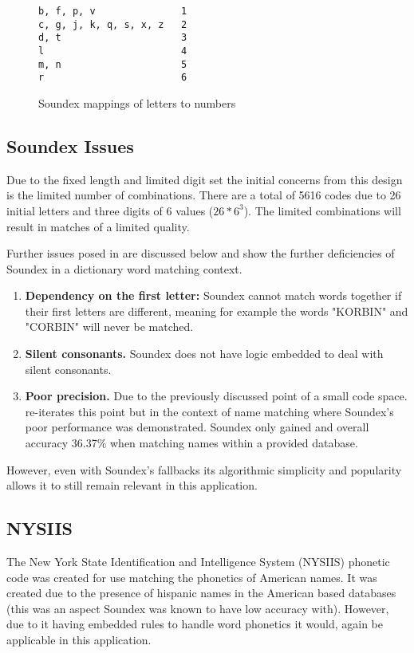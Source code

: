 \begin{figure}[h!]
    \centering
    \begin{BVerbatim}
b, f, p, v               1
c, g, j, k, q, s, x, z   2
d, t                     3
l                        4
m, n                     5
r                        6
    \end{BVerbatim}

    \caption{Soundex mappings of letters to numbers}
    \label{fig:soundexMap}
\end{figure}

\subsection{Soundex Issues}
\label{sec:soundexIssues}

Due to the fixed length and limited digit set the initial concerns from this design is the limited number of combinations. There are a total of 5616 codes due to 26 initial letters and three digits of 6 values ($26 * 6^3$).
The limited combinations will result in matches of a limited quality.

Further issues posed in \cite{patman2001soundex} are discussed below and show the further deficiencies of Soundex in a dictionary word matching context. 

\begin{enumerate}
    \item \textbf{Dependency on the first letter:} Soundex cannot match words together if their first letters are different, meaning for example the words "KORBIN" and "CORBIN" will never be matched.

    \item \textbf{Silent consonants.} Soundex does not have logic embedded to deal with silent consonants.

    \item \textbf{Poor precision.} Due to the previously discussed point of a small code space. \cite{patman2001soundex} re-iterates this point but in the context of name matching where Soundex's poor performance was demonstrated. Soundex only gained and overall accuracy 36.37\% when matching names within a provided database.
\end{enumerate}

However, even with Soundex's fallbacks its algorithmic simplicity and popularity allows it to still remain relevant in this application.

\subsection{NYSIIS}
The New York State Identification and Intelligence System (NYSIIS) phonetic code was created for use matching the phonetics of American names. It was created due to the presence of hispanic names in the American based databases (this was an aspect Soundex was known to have low accuracy with). However, due to it having embedded rules to handle word phonetics it would, again be applicable in this application.

